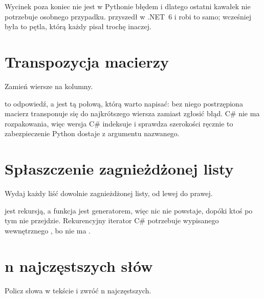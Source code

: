 
\noindent
Wycinek poza koniec nie jest w Pythonie błędem i dlatego ostatni kawałek nie potrzebuje osobnego przypadku.  przyszedł w .NET~6 i robi to samo; wcześniej była to pętla, którą każdy pisał trochę inaczej.

\section{Transpozycja macierzy}
\label{sec:appD-transpose}

\noindent
Zamień wiersze na kolumny.



\noindent
{} to odpowiedź, a  jest tą połową, którą warto napisać: bez niego postrzępiona macierz transponuje się do najkrótszego wiersza zamiast zgłosić błąd. C\# nie ma rozpakowania, więc wersja C\# indeksuje i sprawdza szerokości ręcznie \dash{} to zabezpieczenie Python dostaje z argumentu nazwanego.

\section{Spłaszczenie zagnieżdżonej listy}
\label{sec:appD-flatten}

\noindent
Wydaj każdy liść dowolnie zagnieżdżonej listy, od lewej do prawej.



\noindent
{} jest rekursją, a funkcja jest generatorem, więc nic nie powstaje, dopóki ktoś po tym nie przejdzie. Rekurencyjny iterator C\# potrzebuje wypisanego wewnętrznego , bo nie ma .

\section{n najczęstszych słów}
\label{sec:appD-top-words}

\noindent
Policz słowa w tekście i zwróć n najczęstszych.

